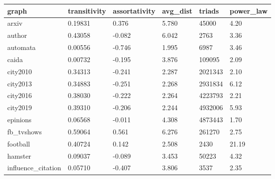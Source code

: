 		\begin{longtable}[c]{|l|l|l|l|l|l|}
			\hline
			\textbf{graph}      & \textbf{transitivity} & \textbf{assortativity} & \textbf{avg\_dist} & \textbf{triads} & \textbf{power\_law} \\ \hline
			\endfirsthead
			\endhead
			arxiv               & 0.19831               & 0.376                  & 5.780              & 45000           & 4.20                \\ \hline
			author              & 0.43058               & -0.082                 & 6.042              & 2763            & 3.36                \\ \hline
			automata            & 0.00556               & -0.746                 & 1.995              & 6987            & 3.46                \\ \hline
			caida               & 0.00732               & -0.195                 & 3.876              & 109095          & 2.09                \\ \hline
			city2010            & 0.34313               & -0.241                 & 2.287              & 2021343         & 2.10                \\ \hline
			city2013            & 0.34883               & -0.251                 & 2.268              & 2931834         & 6.12                \\ \hline
			city2016            & 0.38030               & -0.222                 & 2.264              & 4223793         & 2.21                \\ \hline
			city2019            & 0.39310               & -0.206                 & 2.244              & 4932006         & 5.93                \\ \hline
			epinions            & 0.06568               & -0.011                 & 4.308              & 4873443         & 1.70                \\ \hline
			fb\_tvshows         & 0.59064               & 0.561                  & 6.276              & 261270          & 2.75                \\ \hline
			football            & 0.40724               & 0.142                  & 2.508              & 2430            & 21.19               \\ \hline
			hamster             & 0.09037               & -0.089                 & 3.453              & 50223           & 4.32                \\ \hline
			influence\_citation & 0.05710               & -0.407                 & 3.806              & 3537            & 2.35                \\ \hline

\end{longtable}
